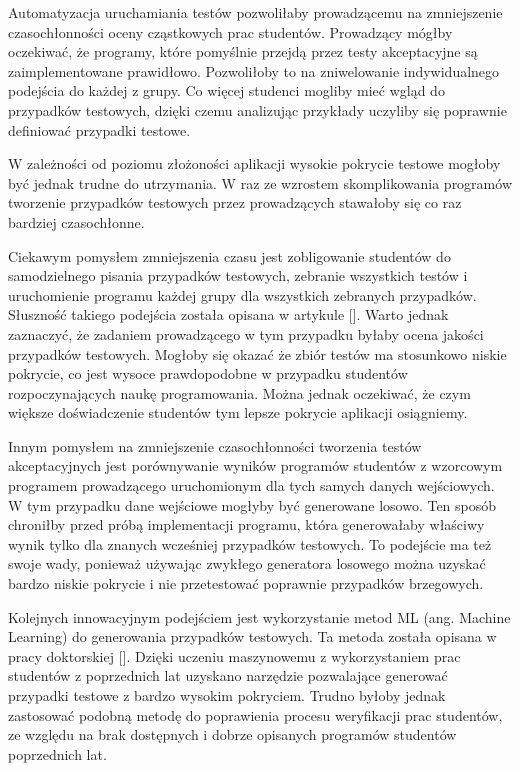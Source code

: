 Automatyzacja uruchamiania testów pozwoliłaby prowadzącemu na zmniejszenie czasochłonności oceny cząstkowych prac studentów.
Prowadzący mógłby oczekiwać, że programy, które pomyślnie przejdą przez testy akceptacyjne są zaimplementowane prawidłowo.
Pozwoliłoby to na zniwelowanie indywidualnego podejścia do każdej z grupy.
Co więcej studenci mogliby mieć wgląd do przypadków testowych, dzięki czemu analizując przykłady uczyliby się poprawnie definiować przypadki testowe.

W zależności od poziomu złożoności aplikacji wysokie pokrycie testowe mogłoby być jednak trudne do utrzymania.
W raz ze wzrostem skomplikowania programów tworzenie przypadków testowych przez prowadzących stawałoby się co raz bardziej czasochłonne.

Ciekawym pomysłem zmniejszenia czasu jest zobligowanie studentów do samodzielnego pisania przypadków testowych, zebranie wszystkich testów i uruchomienie programu każdej grupy dla wszystkich zebranych przypadków. 
Słuszność takiego podejścia została opisana w artykule [].
Warto jednak zaznaczyć, że zadaniem prowadzącego w tym przypadku byłaby ocena jakości przypadków testowych.
Mogłoby się okazać że zbiór testów ma stosunkowo niskie pokrycie, co jest wysoce prawdopodobne w przypadku studentów rozpoczynających naukę programowania.
Można jednak oczekiwać, że czym większe doświadczenie studentów tym lepsze pokrycie aplikacji osiągniemy.

Innym pomysłem na zmniejszenie czasochłonności tworzenia testów akceptacyjnych jest porównywanie wyników programów studentów z wzorcowym programem prowadzącego uruchomionym dla tych samych danych wejściowych.
W tym przypadku dane wejściowe mogłyby być generowane losowo.
Ten sposób chroniłby przed próbą implementacji programu, która generowałaby właściwy wynik tylko dla znanych wcześniej przypadków testowych.
To podejście ma też swoje wady, ponieważ używając zwykłego generatora losowego można uzyskać bardzo niskie pokrycie i nie przetestować poprawnie przypadków brzegowych.

Kolejnych innowacyjnym podejściem jest wykorzystanie metod ML (ang. Machine Learning) do generowania przypadków testowych. 
Ta metoda została opisana w pracy doktorskiej []. 
Dzięki uczeniu maszynowemu z wykorzystaniem prac studentów z poprzednich lat uzyskano narzędzie pozwalające generować przypadki testowe z bardzo wysokim pokryciem.
Trudno byłoby jednak zastosować podobną metodę do poprawienia procesu weryfikacji prac studentów, ze względu na brak dostępnych i dobrze opisanych programów studentów poprzednich lat.




